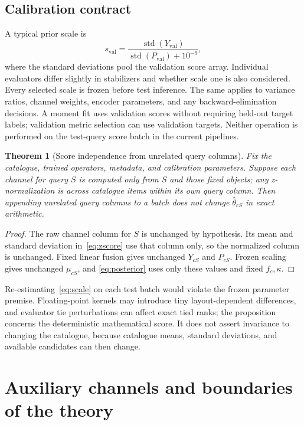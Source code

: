 \documentclass[11pt,a4paper]{article}
\newtheorem{theorem}{Theorem}[section]
\theoremstyle{remark}
\begin{document}
\subsection{Calibration contract}
A typical prior scale is
\begin{equation}
 s_{\mathrm{val}}=\frac{\operatorname{std}(Y_{\mathrm{val}})}
 {\operatorname{std}(P_{\mathrm{val}})+10^{-9}},
 \label{eq:scale}
\end{equation}
where the standard deviations pool the validation score array. Individual
evaluators differ slightly in stabilizers and whether scale one is also
considered. Every selected scale is frozen before test inference. The
same applies to variance ratios, channel weights, encoder parameters,
and any backward-elimination decisions. A moment fit uses validation
scores without requiring held-out target labels; validation metric
selection can use validation targets. Neither operation is performed
on the test-query score batch in the current pipelines.

\begin{theorem}[Score independence from unrelated query columns]
Fix the catalogue, trained operators, metadata, and calibration parameters.
Suppose each channel for query $S$ is computed only from $S$ and those
fixed objects; any z-normalization is across catalogue items within its
own query column. Then appending unrelated query columns to a batch
does not change $\widehat\theta_{cS}$ in exact arithmetic.
\end{theorem}
\begin{proof}
The raw channel column for $S$ is unchanged by hypothesis. Its mean and
standard deviation in~\eqref{eq:zscore} use that column only, so the
normalized column is unchanged. Fixed linear fusion gives unchanged
$Y_{cS}$ and $P_{cS}$. Frozen scaling gives unchanged $\mu_{cS}$, and
\eqref{eq:posterior} uses only these values and fixed $f_c,\kappa$.
\end{proof}
Re-estimating~\eqref{eq:scale} on each test batch would violate the frozen
parameter premise. Floating-point kernels may introduce tiny layout-dependent
differences, and evaluator tie perturbations can affect exact tied ranks;
the proposition concerns the deterministic mathematical score. It does
not assert invariance to changing the catalogue, because catalogue means,
standard deviations, and available candidates can then change.

\section{Auxiliary channels and boundaries of the theory}
\end{document}
